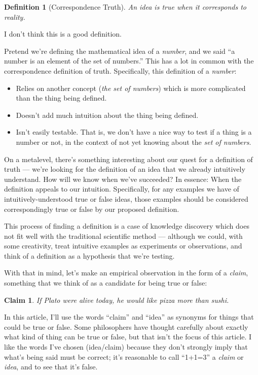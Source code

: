 \documentclass[11pt, oneside]{article}
\newtheorem*{defn}{Definition}
\newtheorem*{claim}{Claim}
\theoremstyle{argtstyle}
\begin{document}
\begin{defn}[Correspondence Truth]\label{d1}
    An idea is true when it corresponds to reality.
\end{defn}

I don't think this is a good definition.

Pretend we're defining the mathematical idea of a {\em number}, and we said
``a number is an element of the set of numbers.'' This 
has a lot in common with the correspondence definition of truth.
Specifically, this definition of a {\em number}:
\begin{itemize}
    \item Relies on another concept ({\em the set of numbers})
        which is more complicated than the thing
        being defined. 
    \item Doesn't add much intuition about the thing being defined.
    \item Isn't easily testable. That is, we don't have a nice
        way to test if a thing is a number or not, in the context of not yet
        knowing about the {\em set of numbers}.
\end{itemize}

On a metalevel, there's something interesting about our quest for a definition
of truth --- we're
looking for the definition of an idea that we already intuitively understand.
How will we know when we've succeeded?
In essence: When the definition
appeals to our intuition.
Specifically, for any examples we have of intuitively-understood true or false
ideas, those examples should be considered correspondingly true or false by our
proposed definition.

This process of finding a definition is a case of
knowledge discovery which does not fit well with the traditional scientific
method --- although we could, with some creativity, treat
intuitive examples as
experiments or observations, and think of a definition as a hypothesis that
we're testing.

With that in mind, let's make an
empirical observation in the form of a
{\em claim}, something that we think of as a candidate for
being true or false:
\begin{claim}\label{c1}
    If Plato were alive today, he would like pizza more than sushi.
\end{claim}
In this article, I'll use the words ``claim'' and ``idea'' as
synonyms for things that could be true or false. Some philosophers have thought
carefully about exactly what kind of thing can be true or false, but that isn't
the focus of this article.
I like the words I've chosen (idea/claim) because they don't
strongly imply that what's being said must be correct; it's reasonable to
call ``1+1=3'' a {\em claim} or {\em idea}, and to see that it's false.
\end{document}

